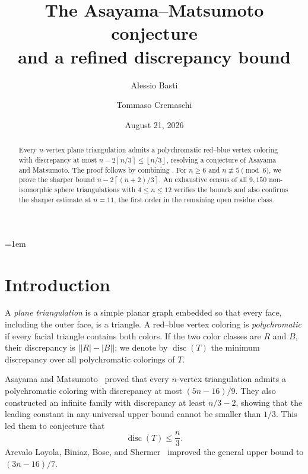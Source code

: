 \documentclass[11pt]{amsart}
\title[The Asayama--Matsumoto conjecture]
{The Asayama--Matsumoto conjecture\\
and a refined discrepancy bound}
\author{Alessio Basti}
\author{Tommaso Cremaschi}
\date{August 21, 2026}
\newcommand{\disc}{\operatorname{disc}}
\newcommand{\ceil}[1]{\left\lceil #1\right\rceil}
\newcommand{\floor}[1]{\left\lfloor #1\right\rfloor}
\begin{document}
\raggedbottom
\emergencystretch=1em

\begin{abstract}
Every $n$-vertex plane triangulation admits a polychromatic red--blue
vertex coloring with discrepancy at most
$n-2\ceil{n/3}\le\floor{n/3}$, resolving a conjecture of Asayama and
Matsumoto. The proof follows by combining \cite{LoyolaEtAl2026,KawarabayashiEtAl2026}. For $n\ge6$ and $n\not\equiv5\pmod6$, we prove the sharper
bound $n-2\ceil{(n+2)/3}$.  An exhaustive census of all $9{,}150$
non-isomorphic sphere triangulations with $4\le n\le12$ verifies the bounds
and also confirms the sharper estimate at $n=11$, the first order in the
remaining open residue class.
\end{abstract}

\maketitle

\section{Introduction}

A \emph{plane triangulation} is a simple planar graph embedded so that every
face, including the outer face, is a triangle. A red--blue vertex coloring is
\emph{polychromatic} if every facial triangle contains both colors. If the
two color classes are \(R\) and \(B\), their discrepancy is
\(\bigl||R|-|B|\bigr|\); we denote by \(\disc(T)\) the minimum discrepancy
over all polychromatic colorings of \(T\).

Asayama and Matsumoto~\cite{AsayamaMatsumoto2022} proved that every
\(n\)-vertex triangulation admits a polychromatic coloring with discrepancy
at most \((5n-16)/9\). They also constructed an infinite family with
discrepancy at least \(n/3-2\), showing that the leading constant in any
universal upper bound cannot be smaller than \(1/3\). This led them to
conjecture that
\begin{equation}\label{eq:AM-conjecture}
  \disc(T)\le \frac{n}{3}.
\end{equation}
Arevalo Loyola, Biniaz, Bose, and Shermer~\cite{LoyolaEtAl2026} 
improved the general upper bound to \((3n-16)/7\).
\end{document}
